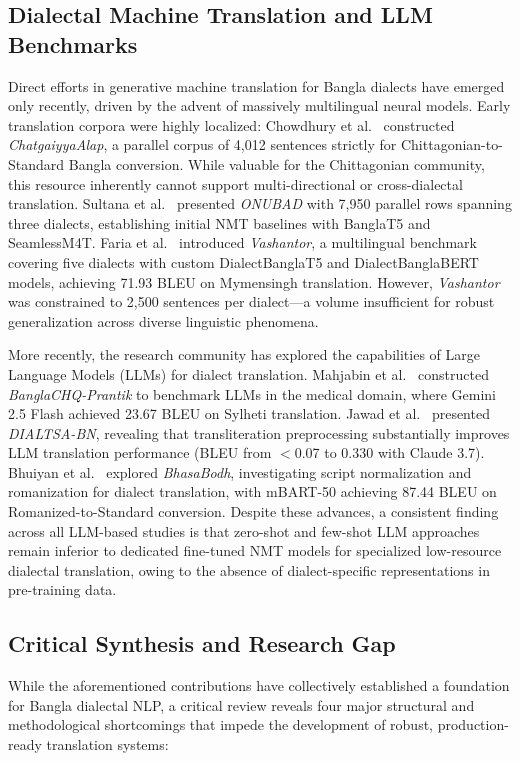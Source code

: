 \documentclass[12pt,a4paper]{article}
\begin{document}
\subsection{Dialectal Machine Translation and LLM Benchmarks}
Direct efforts in generative machine translation for Bangla dialects have emerged only recently, driven by the advent of massively multilingual neural models. Early translation corpora were highly localized: Chowdhury et al.~\cite{chowdhury2025chatgaiyya} constructed \textit{ChatgaiyyaAlap}, a parallel corpus of 4,012 sentences strictly for Chittagonian-to-Standard Bangla conversion. While valuable for the Chittagonian community, this resource inherently cannot support multi-directional or cross-dialectal translation. Sultana et al.~\cite{sultana2025onubad} presented \textit{ONUBAD} with 7,950 parallel rows spanning three dialects, establishing initial NMT baselines with BanglaT5 and SeamlessM4T. Faria et al.~\cite{faria2025vashantor} introduced \textit{Vashantor}, a multilingual benchmark covering five dialects with custom DialectBanglaT5 and DialectBanglaBERT models, achieving 71.93 BLEU on Mymensingh translation. However, \textit{Vashantor} was constrained to 2,500 sentences per dialect---a volume insufficient for robust generalization across diverse linguistic phenomena.

More recently, the research community has explored the capabilities of Large Language Models (LLMs) for dialect translation. Mahjabin et al.~\cite{mahjabin2025banglachq} constructed \textit{BanglaCHQ-Prantik} to benchmark LLMs in the medical domain, where Gemini 2.5 Flash achieved 23.67 BLEU on Sylheti translation. Jawad et al.~\cite{jawad2025dialtsa} presented \textit{DIALTSA-BN}, revealing that transliteration preprocessing substantially improves LLM translation performance (BLEU from $<$0.07 to 0.330 with Claude 3.7). Bhuiyan et al.~\cite{bhuiyan2025bhasabodh} explored \textit{BhasaBodh}, investigating script normalization and romanization for dialect translation, with mBART-50 achieving 87.44 BLEU on Romanized-to-Standard conversion. Despite these advances, a consistent finding across all LLM-based studies is that zero-shot and few-shot LLM approaches remain inferior to dedicated fine-tuned NMT models for specialized low-resource dialectal translation, owing to the absence of dialect-specific representations in pre-training data.

\subsection{Critical Synthesis and Research Gap}
While the aforementioned contributions have collectively established a foundation for Bangla dialectal NLP, a critical review reveals four major structural and methodological shortcomings that impede the development of robust, production-ready translation systems:
\end{document}
